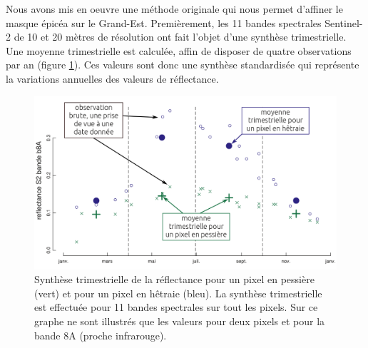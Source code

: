 \documentclass[a4paper, 12pt]{article} %
\begin{document}
Nous avons mis en oeuvre une méthode originale qui nous permet d'affiner le masque épicéa sur le Grand-Est. 
Premièrement, les 11 bandes spectrales Sentinel-2 de 10 et 20 mètres de résolution ont fait l'objet d'une synthèse trimestrielle. 
Une moyenne trimestrielle est calculée, affin de disposer de quatre observations par an (figure \ref{fig:syntTri}). 
Ces valeurs sont donc une synthèse standardisée qui représente la variations annuelles des valeurs de réflectance. 

\begin{figure}
	\centering
	\includegraphics[width=\linewidth]{synthesTrimestre.png}
	\caption{Synthèse trimestrielle de la réflectance pour un pixel en pessière (vert) et pour un pixel en hêtraie (bleu). La synthèse trimestrielle est effectuée pour 11 bandes spectrales sur tout les pixels. Sur ce graphe ne sont illustrés que les valeurs pour deux pixels et pour la bande 8A (proche infrarouge).}
	\label{fig:syntTri}
\end{figure}
\end{document}
